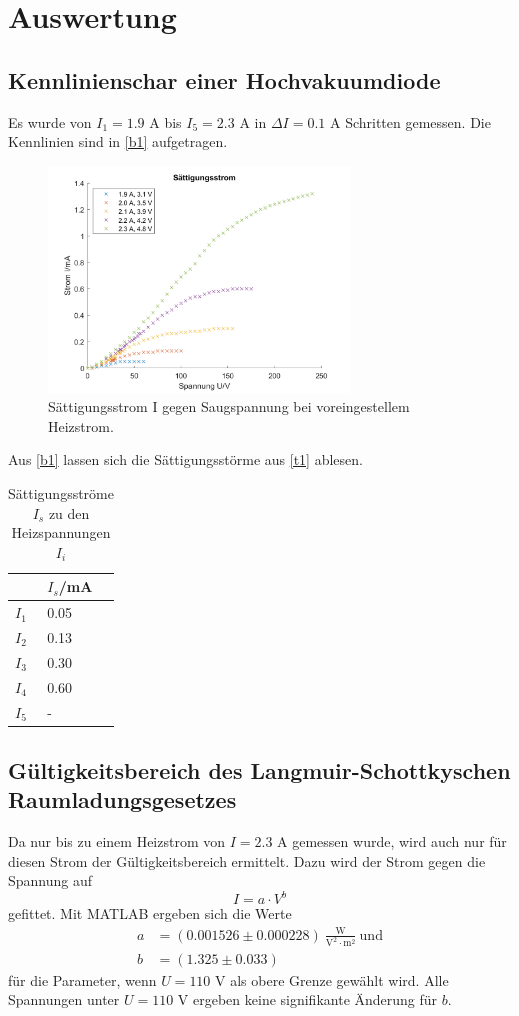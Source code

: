 \section{Auswertung}
\label{sec:Auswertung}
\subsection{Kennlinienschar einer Hochvakuumdiode}
 Es wurde von $I_{1}=1.9$ A bis $I_{5}=2.3$ A in $\Delta I=0.1$ A Schritten gemessen. Die Kennlinien sind in \autoref{b1} aufgetragen.
 \begin{figure}[H]
 \centering
 \includegraphics[width=8cm]{s.png}
 \caption{Sättigungsstrom I gegen Saugspannung bei voreingestellem Heizstrom.}
 \label{b1}
 \end{figure}
 Aus \autoref{b1} lassen sich die Sättigungsstörme aus \autoref{t1} ablesen. 
 \begin{table}[H]
  \centering
  \caption{Sättigungsströme $I_{s}$ zu den Heizspannungen $I_{i}$}
  \begin{tabular}{l|l}
  & $I_{s}$/mA\\\hline
  $I_{1}$ & 0.05\\
  $I_{2}$ & 0.13\\
  $I_{3}$ & 0.30\\
  $I_{4}$ & 0.60\\
  $I_{5}$ & -\\\hline
  \end{tabular}
  \label{t1}
 \end{table}

 \subsection{Gültigkeitsbereich des Langmuir-Schottkyschen Raumladungsgesetzes}
 Da nur bis zu einem Heizstrom von $I=2.3$ A gemessen wurde, wird auch nur für diesen Strom der Gültigkeitsbereich ermittelt. Dazu wird der Strom gegen die Spannung auf
 \begin{equation*}
   I=a\cdot V^{b}
 \end{equation*}
 gefittet. Mit MATLAB ergeben sich die Werte
 \begin{align*}
   a&=(0.001526 \pm 0.000228)\ \frac{\textrm{W}}{\textrm{V}^2 \cdot\textrm{m}^2}\ \textrm{und}\\
   b&=(1.325 \pm 0.033)
 \end{align*}
 für die Parameter, wenn $U=110$ V als obere Grenze gewählt wird. Alle Spannungen unter $U=110$ V ergeben keine signifikante Änderung für $b$.
 
